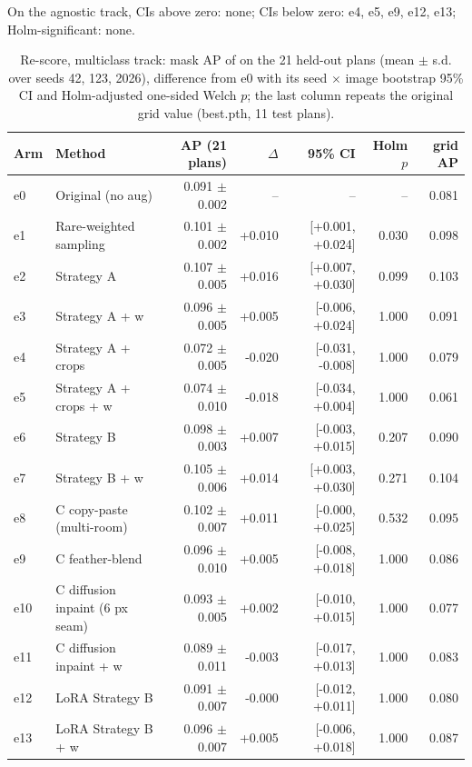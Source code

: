 On the agnostic track, CIs above zero: none; CIs below zero: e4, e5, e9, e12, e13; Holm-significant: none.

\begin{table}[H]
\centering
\caption{Re-score, multiclass track: mask AP of  on the 21 held-out plans (mean $\pm$ s.d. over seeds 42, 123, 2026), difference from e0 with its seed $\times$ image bootstrap 95\% CI and Holm-adjusted one-sided Welch $p$; the last column repeats the original grid value (best.pth, 11 test plans).}
\label{tab:rescoremulticlass}
\small
\begin{tabular}{@{}llrrrrr@{}}
\toprule
Arm & Method & AP (21 plans) & $\Delta$ & 95\% CI & Holm $p$ & grid AP \\
\midrule
e0 & Original (no aug) & 0.091 $\pm$ 0.002 & -- & -- & -- & 0.081 \\
e1 & Rare-weighted sampling & 0.101 $\pm$ 0.002 & +0.010 & [+0.001, +0.024] & 0.030 & 0.098 \\
e2 & Strategy A & 0.107 $\pm$ 0.005 & +0.016 & [+0.007, +0.030] & 0.099 & 0.103 \\
e3 & Strategy A + w & 0.096 $\pm$ 0.005 & +0.005 & [-0.006, +0.024] & 1.000 & 0.091 \\
e4 & Strategy A + crops & 0.072 $\pm$ 0.005 & -0.020 & [-0.031, -0.008] & 1.000 & 0.079 \\
e5 & Strategy A + crops + w & 0.074 $\pm$ 0.010 & -0.018 & [-0.034, +0.004] & 1.000 & 0.061 \\
e6 & Strategy B & 0.098 $\pm$ 0.003 & +0.007 & [-0.003, +0.015] & 0.207 & 0.090 \\
e7 & Strategy B + w & 0.105 $\pm$ 0.006 & +0.014 & [+0.003, +0.030] & 0.271 & 0.104 \\
e8 & C copy-paste (multi-room) & 0.102 $\pm$ 0.007 & +0.011 & [-0.000, +0.025] & 0.532 & 0.095 \\
e9 & C feather-blend & 0.096 $\pm$ 0.010 & +0.005 & [-0.008, +0.018] & 1.000 & 0.086 \\
e10 & C diffusion inpaint (6 px seam) & 0.093 $\pm$ 0.005 & +0.002 & [-0.010, +0.015] & 1.000 & 0.077 \\
e11 & C diffusion inpaint + w & 0.089 $\pm$ 0.011 & -0.003 & [-0.017, +0.013] & 1.000 & 0.083 \\
e12 & LoRA Strategy B & 0.091 $\pm$ 0.007 & -0.000 & [-0.012, +0.011] & 1.000 & 0.080 \\
e13 & LoRA Strategy B + w & 0.096 $\pm$ 0.007 & +0.005 & [-0.006, +0.018] & 1.000 & 0.087 \\
\bottomrule
\end{tabular}
\end{table}

